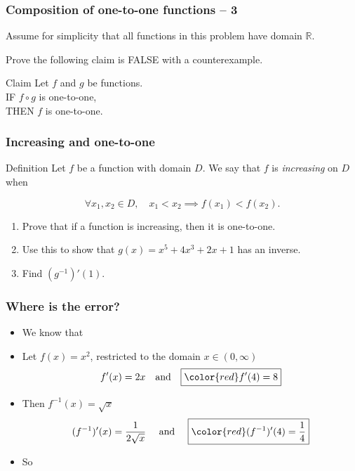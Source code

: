 \begin{frame}[t]
	\frametitle{Composition of one-to-one functions -- 3}

	Assume for simplicity that all functions in this problem have domain
	$\mathbb{R}$.

	\vfill

	Prove the following claim is FALSE with a counterexample.

	\vfill

	\begin{block}{Claim }
		Let $f$ and $g$ be functions. \\ IF $f \circ g$ is one-to-one, \\ THEN $f$ is
		one-to-one.
	\end{block}

	\vfill
\end{frame}

\begin{frame}[t]
	\frametitle{Increasing and one-to-one}

	\begin{block}{Definition}
		Let $f$ be a function with domain $D$. We say that $f$ is \emph{increasing} on
		$D$ when

		\[
			\forall x_{1}, x_{2}\in D, \quad x_{1}<x_{2}\implies f(x_{1})<f(x_{2}).
		\]
	\end{block}

	\begin{enumerate}
		\item Prove that if a function is increasing, then it is one-to-one.

		\item Use this to show that $g(x) = x^{5}+ 4x^{3}+ 2x + 1$ has an inverse.

		\item Find $(g^{-1})'(1)$.
	\end{enumerate}
\end{frame}

\begin{frame}[t]
	\frametitle{Where is the error?}

	\begin{itemize}
		\item We know that 

		\item Let $\displaystyle f(x) = x^{2}$, restricted to the domain
			$\displaystyle x \in (0, \infty)$
			\[
				f'(x) = 2x \quad \text{and}\quad \boxed{{\color{red} f'(4) = 8}}
			\]

		\item Then $\displaystyle f^{-1}(x) = \sqrt{x}$
			\[
				(f^{-1})'(x) = \frac{1}{2\sqrt{x}}\quad \text{ and }\quad \boxed{{\color{red} (f^{-1})'(4) = \frac{1}{4}}}
			\]

		\item So 
	\end{itemize}
\end{frame}

